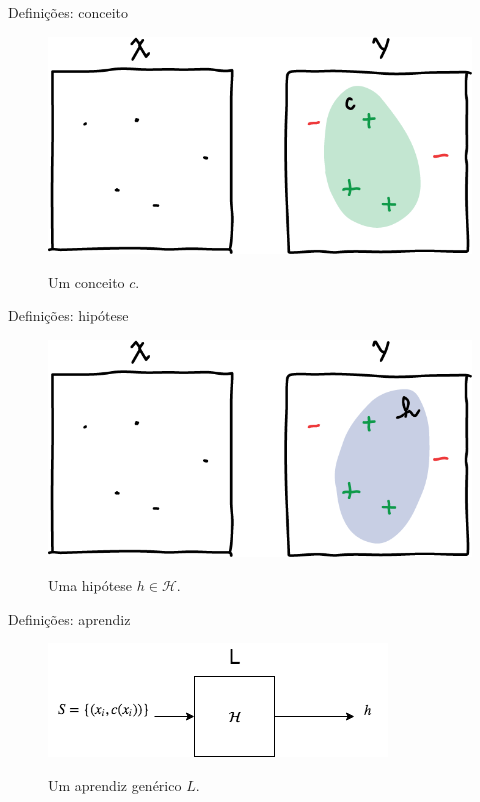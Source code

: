 \documentclass[10pt, professionalfonts]{beamer}
\begin{document}
{\begin{frame}{Definições: conceito}
  \begin{figure}[!htp]
    \centering
    \includegraphics[width=.8\textwidth]{concept}
    \label{concept}
    \caption{Um conceito $c$.}
  \end{figure}
\end{frame}
\begin{frame}{Definições: hipótese}
  \begin{figure}[!htp]
    \centering
    \includegraphics[width=.8\textwidth]{hypothesis}
    \label{hypothesis}
    \caption{Uma hipótese $h \in \mathcal{H}$.}
  \end{figure}
\end{frame}
\begin{frame}{Definições: aprendiz}
  \begin{figure}[!htp]
    \centering
    \includegraphics[width=.8\textwidth]{diagram}
    \label{diagram}
    \caption{Um aprendiz genérico $L$.}
  \end{figure}


\end{frame}}
\end{document}
